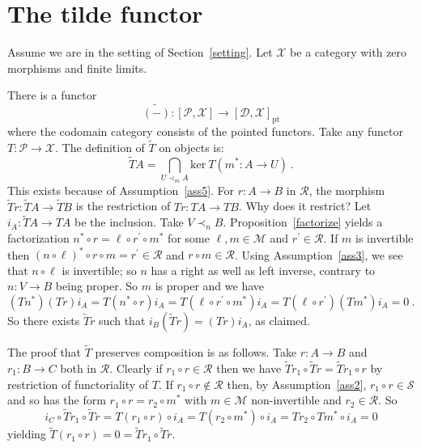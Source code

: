 \documentclass[a4paper,12pt,reqno]{amsart}
\theoremstyle{definition}
\theoremstyle{fact}
\theoremstyle{genquest}
\theoremstyle{step}
\newcommand{\lra}{\longrightarrow}
\newcommand{\ra}{\rightarrow}
\def\CD{{\mathscr D}}
\def\CM{{\mathscr M}}
\def\CP{{\mathscr P}}
\def\CR{{\mathscr R}}
\def\CS{{\mathscr S}}
\def\CX{{\mathscr X}}
\begin{document}
\section{The tilde functor}\label{tilde}

Assume we are in the setting of Section~\ref{setting}. Let $\CX$ be a category with zero morphisms and finite limits. 

There is a functor
\begin{equation}\label{tilde}
\widetilde{(-)} : [\CP,\CX] \lra [\CD,\CX]_{\mathrm{pt}}
\end{equation}
where the codomain category consists of the pointed functors.
Take any functor $T:\CP\ra\CX$. 
The definition of $\widetilde{T}$ on objects is:
\begin{equation}\label{tildeformula}
\widetilde{T}A = \bigcap_{U\prec_m A} {\mathrm{ker} \ {T(m^*:A\ra U)}} \ .
\end{equation}
This exists because of Assumption~\ref{ass5}.
For $r:A\ra B$ in $\CR$, the morphism 
$\widetilde{T}r : \widetilde{T}A \lra \widetilde{T}B$
is the restriction of $Tr : TA \ra TB$. 
Why does it restrict? Let $i_A : \widetilde{T}A \ra TA$
be the inclusion. Take $V \prec_n B$.  
Proposition~\ref{factorize} yields a factorization 
$n^*\circ r = \ell \circ r^{\prime} \circ m^*$ for some $\ell , m \in \CM$ and
$r^{\prime} \in \CR$. If $m$ is invertible then 
$(n\circ \ell)^*\circ r \circ m = r^{\prime} \in \CR$ and $r \circ m \in \CR$. 
Using Assumption~\ref{ass3}, we see that $n\circ \ell$ is invertible; so $n$ has a right as well as left inverse, contrary to $n:V\ra B$ being proper.    
So $m$ is proper and we have $$(Tn^*)(Tr)i_A = T(n^*\circ r)i_A = T(\ell \circ r^{\prime} \circ m^*)i_A = T(\ell \circ r^{\prime})(Tm^*)i_A = 0 \ .$$ 
So there exists $\widetilde{T}r$ such that $i_B (\widetilde{T}r) = (Tr)i_A$,
as claimed.

The proof that $\widetilde{T}$ preserves composition is as follows. Take $r:A\ra B$ and
$r_1:B\ra C$ both in $\CR$. 
Clearly if $r_1\circ r\in \CR$ then we have 
$\widetilde{T}r_1\circ \widetilde{T}r = \widetilde{T}r_1\circ r$ by restriction of functoriality of $T$. If $r_1\circ r\notin \CR$ then, by Assumption~\ref{ass2}, $r_1\circ r\in \CS$
and so has the form $r_1\circ r = r_2\circ m^*$ with $m\in \CM$ non-invertible and
$r_2\in \CR$. So 
$$i_C\circ \widetilde{T}r_1\circ \widetilde{T}r = T(r_1\circ r)\circ i_A = T(r_2\circ m^*)\circ i_A = Tr_2\circ Tm^*\circ i_A = 0$$
yielding $\widetilde{T}(r_1\circ r) = 0 = \widetilde{T}r_1\circ \widetilde{T}r$.  
\end{document}

